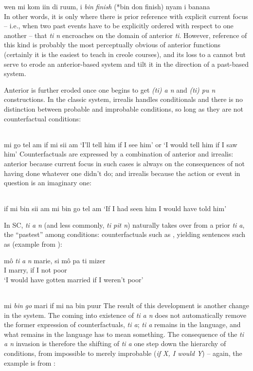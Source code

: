 \ea\label{ex:2:111}
 wen mi kom iin di ruum, i \textit{bin} \textit{finish }(*bin don finish) nyam i banana\\
\z
In other words, it is only where there is prior reference with explicit current focus  --  i.e., when two past events have to be explicitly ordered with respect to one another  --  that \textit{ti n} encroaches on the domain of anterior \textit{ti}. However, reference of this kind is probably the most perceptually obvious of anterior functions (certainly it is the easiest to teach in creole courses), and its loss to a  cannot but serve to erode an anterior-based system and tilt it in the direction of a past-based system.


Anterior is further eroded once one begins to get \textit{(ti) a n} and \textit{(ti) pu n} constructions. In the classic system, irrealis handles condi\-tionals and there is no distinction between probable and improbable conditions, so long as they are not counterfactual conditions:

\ea\label{ex:2:112}
\ili{\langGC}{}{}\\
mi go tel am if mi sii am
\glt `I'll tell him if I see him' or `I would tell him if I saw him'
\z
Counterfactuals are expressed by a combination of anterior and irrealis: anterior because current focus in such cases is always on the conse\-quences of not having done whatever one didn't do; and irrealis because the action or event in question is an imaginary one:

\ea\label{ex:2:113}
\ili{\langGC}{}{}\\
if mi bin sii am mi bin go tel am
\glt `If I had seen him I would have told him'
\z

In SC, \textit{ti a n} (and less commonly, \textit{ti pit n}) naturally takes over from a prior \textit{ti a}, the ``pastest'' among conditions: counterfactuals such as , yielding sentences such as  (example from \cite[109]{Corne1977}):

\ea\label{ex:2:114}
\gll mô \emph{ti} \emph{a} \emph{n} marie, si mô pa ti mizer\\
I {\TNS} {\MOD} {\COMP} marry, if I not {\TNS} poor\\
\glt `I would have gotten married if I weren't poor' 
\z

\ea\label{ex:2:115}
\ili{\langGC}{}{}\\
mi \textit{bin} \textit{go} mari if mi na bin puur
\z
The result of this development is another change in the system. The coming into existence of \textit{ti a n} does not automatically remove the former expression of counterfactuals, \textit{ti a}; \textit{ti a} remains in the lan\-guage, and what remains in the language has to mean something. The consequence of the \textit{ti a n} invasion is therefore the shifting of \textit{ti a} one step down the hierarchy of conditions, from impossible to merely improbable (\textit{if X, I would Y})  --  again, the example is from \citet[106]{Corne1977}:


